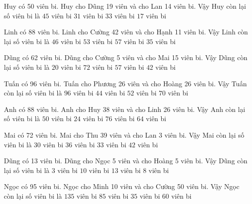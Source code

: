 \documentclass[12pt,a4paper]{article}
\begin{document}
\begin{ex}
Huy có 50 viên bi. Huy cho Dũng 19 viên và cho Lan 14 viên bi. Vậy Huy còn lại số viên bi là
 \choice 
{$45$ viên bi}
{$31$ viên bi}
{$33$ viên bi}
{\True $17$ viên bi}
\end{ex}
\begin{ex}
Linh có 88 viên bi. Linh cho Cường 42 viên và cho Hạnh 11 viên bi. Vậy Linh còn lại số viên bi là
 \choice 
{$46$ viên bi}
{$53$ viên bi}
{$57$ viên bi}
{\True $35$ viên bi}
\end{ex}
\begin{ex}
Dũng có 62 viên bi. Dũng cho Cường 5 viên và cho Mai 15 viên bi. Vậy Dũng còn lại số viên bi là
 \choice 
{$20$ viên bi}
{$72$ viên bi}
{$57$ viên bi}
{\True $42$ viên bi}
\end{ex}
\begin{ex}
Tuấn có 96 viên bi. Tuấn cho Phương 26 viên và cho Hoàng 26 viên bi. Vậy Tuấn còn lại số viên bi là
 \choice 
{$96$ viên bi}
{\True $44$ viên bi}
{$52$ viên bi}
{$70$ viên bi}
\end{ex}
\begin{ex}
Anh có 88 viên bi. Anh cho Huy 38 viên và cho Linh 26 viên bi. Vậy Anh còn lại số viên bi là
 \choice 
{$50$ viên bi}
{\True $24$ viên bi}
{$76$ viên bi}
{$64$ viên bi}
\end{ex}
\begin{ex}
Mai có 72 viên bi. Mai cho Thu 39 viên và cho Lan 3 viên bi. Vậy Mai còn lại số viên bi là
 \choice 
{\True $30$ viên bi}
{$36$ viên bi}
{$33$ viên bi}
{$42$ viên bi}
\end{ex}
\begin{ex}
Dũng có 13 viên bi. Dũng cho Ngọc 5 viên và cho Hoàng 5 viên bi. Vậy Dũng còn lại số viên bi là
 \choice 
{\True $3$ viên bi}
{$10$ viên bi}
{$13$ viên bi}
{$8$ viên bi}
\end{ex}
\begin{ex}
Ngọc có 95 viên bi. Ngọc cho Minh 10 viên và cho Cường 50 viên bi. Vậy Ngọc còn lại số viên bi là
 \choice 
{$135$ viên bi}
{$85$ viên bi}
{\True $35$ viên bi}
{$60$ viên bi}
\end{ex}
\end{document}
